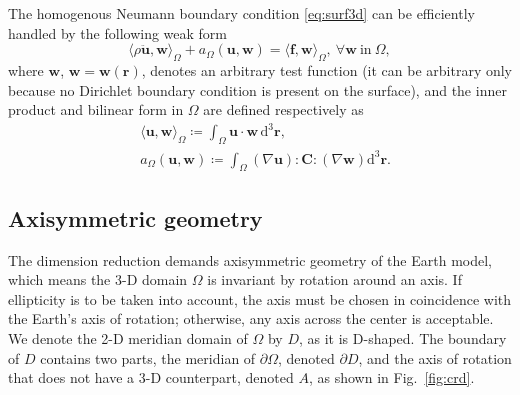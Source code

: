 \documentclass[extra,referee]{gji}
\begin{document}
The homogenous Neumann boundary condition \eqref{eq:surf3d} can be
efficiently handled by the following weak form 
\begin{equation}
  \langle \rho\ddot{\mathbf{u}},\mathbf{w}\rangle_{\Omega}+
  a_{\Omega}\left(\mathbf{u},\mathbf{w}\right)=\langle 
  \mathbf{f},\mathbf{w}\rangle_{\Omega}
  ,\ \forall\mathbf{w}\ \text{in}\ \Omega,
  \label{eq:3dweak}
\end{equation}
where $\mathbf{w}$, $\mathbf{w}=\mathbf{w}\left(\mathbf{r}\right)$, denotes an
arbitrary test function (it can be arbitrary only because no Dirichlet
boundary condition is present on the surface), and the inner product and 
bilinear form in $\Omega$ are defined respectively as
\begin{align}
  & \langle \mathbf{u},\mathbf{w}\rangle _{\Omega} \coloneqq
  \int_{\Omega}\mathbf{u}\cdot\mathbf{w}\,\text{d}^{3}\mathbf{r},\label{eq:3din}\\[.5em]
  & a_{\Omega}\left(\mathbf{u},\mathbf{w}\right) \coloneqq
  \int_{\Omega}\left(\nabla\mathbf{u}\right):\mathbf{C}:\left(\nabla\mathbf{w}\right)\text{d}^{3}\mathbf{r}.
  \label{eq:3dbi}
\end{align}

\subsection{Axisymmetric geometry}
The dimension reduction demands axisymmetric geometry
of the Earth model, which means the 3-D domain $\Omega$
is invariant by rotation around an axis. 
If ellipticity is to be taken into account, the
axis must be chosen in coincidence with the Earth's
axis of rotation; otherwise, any axis across the center is acceptable. 
We denote the 2-D meridian domain of $\Omega$ by $D$,
as it is D-shaped. The boundary of $D$ contains two parts, the meridian
of $\partial\Omega$, denoted $\partial D$, and the axis of rotation
that does not have a 3-D counterpart, denoted $A$, as shown in 
Fig.~\ref{fig:crd}.
\end{document}
